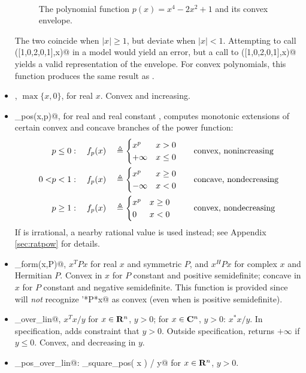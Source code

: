\documentclass[12pt]{article}
\begin{document}
\begin{itemize}
\begin{figure}
\begin{center}
\end{center}
~\\[-48pt]
\caption{The polynomial function $p(x)=x^4-2x^2+1$ and its convex envelope.}
\label{fig:envelope}
\end{figure}
The two coincide when $|x|\geq 1$, but deviate when $|x|<1$. Attempting to call
\verb@polyval([1,0,2,0,1],x)@ in a \cvx model would  yield an error,
but a call to \verb@polyenv([1,0,2,0,1],x)@ yields a valid 
representation of the envelope. For convex polynomials,
this function produces the same result as \verb@polyval@.
\item \verb@pos@, $\max\{x,0\}$, for real $x$. 
Convex and increasing.
\item \verb@pow_pos(x,p)@, for real \verb@x@ and real constant \verb@p@,
computes monotonic extensions of certain convex and concave branches of
the power function:
\begin{equation*}
	\begin{aligned}
	&p \leq 0: \quad  
	f_p(x) &&\triangleq \begin{cases}  x^p & x > 0 \\ +\infty & x \leq 0  \end{cases} 
	&& \quad \text{convex, nonincreasing} \\
	0 <  &p < 1: \quad
	f_p(x) &&\triangleq\begin{cases}  x^p & x \geq 0 \\ -\infty & x < 0  \end{cases} 
	&& \quad  \text{concave, nondecreasing} \\
	&p \geq 1: \quad
	f_p(x) && \triangleq\begin{cases}  x^p & x \geq 0 \\ 0 & x < 0  \end{cases}
	&& \quad \text{convex, nondecreasing}
	\end{aligned}
\end{equation*}
If \verb@p@ is irrational, a nearby rational value is used
instead; see Appendix \ref{sec:ratpow} for details.
\item \verb@quad_form(x,P)@, $x^TPx$ for real $x$ and symmetric $P$,
and $x^HPx$ for complex $x$ and Hermitian $P$.
Convex in $x$ for $P$ constant and positive semidefinite;
concave in $x$ for $P$ constant and negative semidefinite.
This function is provided since \cvx will \emph{not}
recognize \verb@x'*P*x@ as convex (even when \verb@P@ is 
positive semidefinite).
\item \verb@quad_over_lin@, $x^Tx/y$ for $x \in \R^n$, $y >0$;
for $x \in \mathbf{C}^n$, $y>0$: $x^*x/y$.  In \cvx specification,
adds constraint that $y>0$.  Outside \cvx specification,
returns $+\infty$ if $y\leq 0$.
Convex, and decreasing in $y$.
\item \verb@quad_pos_over_lin@: \verb@sum_square_pos( x ) / y@
for $x\in\R^n$, $y>0$.

\end{itemize}
\end{document}
